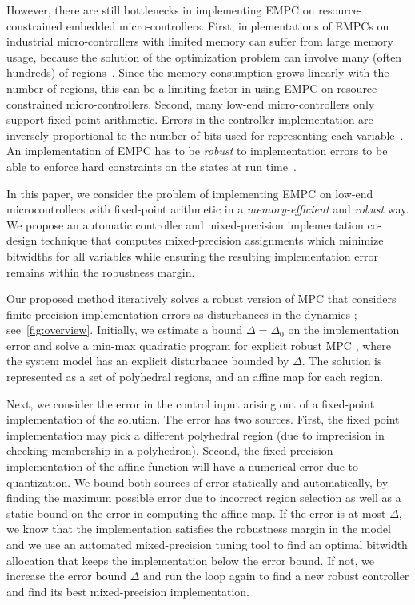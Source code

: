 However, there are still bottlenecks in implementing EMPC on resource-constrained embedded micro-controllers.
First, implementations of EMPCs on industrial micro-controllers with limited memory can suffer from large memory usage, because the solution of the optimization
problem can involve many (often hundreds) of regions~\cite{memoryMPC}.
Since the memory consumption grows linearly with the number of regions, 
this can be a limiting factor in using EMPC on resource-constrained micro-controllers.
Second, many low-end micro-controllers only support fixed-point arithmetic.
Errors in the controller implementation are inversely proportional to the number of bits used for representing each variable~\cite{Anta10}. 
An implementation of EMPC has to be \emph{robust} to 
implementation errors to be able to enforce hard constraints on the states at run time~\cite{imperialrmpc}.

In this paper, we consider the problem of implementing EMPC on low-end microcontrollers with fixed-point arithmetic
in a \emph{memory-efficient} and \emph{robust} way.
We propose an automatic controller and mixed-precision implementation co-design
technique that computes mixed-precision assignments which minimize bitwidths for all
variables while ensuring the resulting implementation error remains within the
robustness margin.


Our proposed method iteratively solves a robust version of MPC 
that considers finite-precision implementation errors as disturbances
in the dynamics \cite{RamirezC06}; see~\autoref{fig:overview}.
Initially, we estimate a bound $\Delta = \Delta_0$ on the implementation error and solve a
min-max quadratic program for explicit robust MPC \cite{delaPea:2005,RamirezC06}, where the system
model has an explicit disturbance bounded by $\Delta$.
The solution is represented as a set of polyhedral regions, and an affine map for each region.

Next, we consider the error in the control input arising out of a fixed-point implementation of the solution.
The error has two sources.
First, the fixed point implementation may pick a different polyhedral region (due to imprecision
in checking membership in a polyhedron).
Second, the fixed-precision implementation of the affine function will have a numerical error due to quantization.
We bound both sources of error statically and automatically,  by finding the maximum possible error due to incorrect region selection
as well as a static bound on the error in computing the affine map.
If the error is at most $\Delta$, we know that the implementation satisfies the robustness margin in the model and
we use an automated mixed-precision tuning tool to find an optimal bitwidth allocation that keeps the implementation below the error bound.
If not, we increase the error bound $\Delta$ and run the loop again to find a new robust controller and find its best mixed-precision
implementation. %


